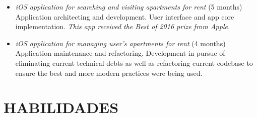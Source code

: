\documentclass[]{res} %
\newcommand{\sbt}{\,\begin{picture}(-1,1)(-2,-3)\circle*{2}\end{picture}\ }
\def \divspace{6pt}
\def \myitemback{0.55cm}
\def \myitemsep{0pt}
\newif\ifport
\newif\ifgames
\begin{document}
\begin{resume}
\begin{itemize}[itemsep=\myitemsep,leftmargin=\myitemback]
    \ifgames
        \vfill
    \else
    \fi

    \item[\sbt] {\it iOS application for searching and visiting apartments for rent} \hfill (5 months)\\
    Application architecting and development. User interface and app core implementation. {\it This app received the Best of 2016 prize from Apple.} 
    \item[\sbt] {\it iOS application for managing user's apartments for rent} \hfill (4 months)\\
    Application maintenance and refactoring. Development in pursue of eliminating current technical debts as well as refactoring current codebase to ensure the best and more modern practices were being used.
    
    \ifgames
    \else
    \fi
    \end{itemize}
\fi
\ifport
    \section{HABILIDADES \hspace{\divspace} }


\end{resume}
\end{document}
